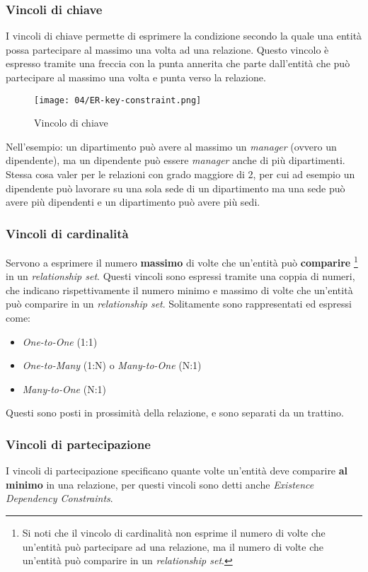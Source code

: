         \subsubsection{Vincoli di chiave}
            I vincoli di chiave permette di esprimere la condizione secondo la quale una entità possa partecipare al massimo una volta ad una relazione. Questo vincolo è espresso tramite una freccia con la punta annerita che parte dall'entità che può partecipare al massimo una volta e punta verso la relazione.
            \begin{figure}[H]
                \centering
                \texttt{[image: 04/ER-key-constraint.png]}
                \caption{Vincolo di chiave}
            \end{figure}
            Nell'esempio: un dipartimento può avere al massimo un \textit{manager} (ovvero un dipendente), ma un dipendente può essere \textit{manager} anche di più dipartimenti.\newline
            Stessa cosa valer per le relazioni con grado maggiore di 2, per cui ad esempio un dipendente può lavorare su una sola sede di un dipartimento ma una sede può avere più dipendenti e un dipartimento può avere più sedi.
        \subsubsection{Vincoli di cardinalità}
            Servono a esprimere il numero \textbf{massimo} di volte che un'entità può \textbf{comparire} \footnote{Si noti che il vincolo di cardinalità non esprime il numero di volte che un'entità può partecipare ad una relazione, ma il numero di volte che un'entità può comparire in un \textit{relationship set}.} in un \textit{relationship set}. Questi vincoli sono espressi tramite una coppia di numeri, che indicano rispettivamente il numero minimo e massimo di volte che un'entità può comparire in un \textit{relationship set}.\newline
            Solitamente sono rappresentati ed espressi come:
            \begin{itemize}
                \item \textit{One-to-One} (1:1)
                \item \textit{One-to-Many} (1:N) o \textit{Many-to-One} (N:1)
                \item \textit{Many-to-One} (N:1)
            \end{itemize}
            Questi sono posti in prossimità della relazione, e sono separati da un trattino.
        \subsubsection{Vincoli di partecipazione}
            I vincoli di partecipazione specificano quante volte un'entità deve comparire \textbf{al minimo} in una relazione, per questi vincoli sono detti anche \textit{Existence Dependency Constraints}. 

